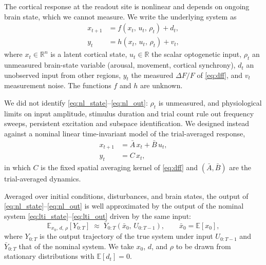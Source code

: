 The cortical response at the readout site is nonlinear and depends on ongoing brain state, which we cannot measure.
We write the underlying system as
%
\begin{align}
    x_{t+1} &= f(x_{t},\,u_{t},\,\rho_{t}) + d_{t}, \label{eq:nl_state}\\
    y_{t}   &= h(x_{t},\,u_{t},\,\rho_{t}) + v_{t}, \label{eq:nl_out}
\end{align}
%
where $x_t \in \mathbb{R}^{n}$ is a latent cortical state, $u_t \in \mathbb{R}$ the scalar optogenetic input, $\rho_t$ an unmeasured brain-state variable (arousal, movement, cortical synchrony), $d_t$ an unobserved input from other regions, $y_t$ the measured $\Delta F/F$ of \eqref{eq:dff}, and $v_t$ measurement noise.
The functions $f$ and $h$ are unknown.

We did not identify \eqref{eq:nl_state}--\eqref{eq:nl_out}: $\rho_t$ is unmeasured, and physiological limits on input amplitude, stimulus duration and trial count rule out frequency sweeps, persistent excitation and subspace identification.
We designed instead against a nominal linear time-invariant model of the trial-averaged response,
%
\begin{align}
    x_{t+1} &= \bar{A}\,x_{t} + \bar{B}\,u_{t}, \label{eq:lti_state}\\
    y_{t}   &= C\,x_{t},                        \label{eq:lti_out}
\end{align}
%
in which $C$ is the fixed spatial averaging kernel of \eqref{eq:dff} and $(\bar A, \bar B)$ are the trial-averaged dynamics.

\begin{assumption}
\label{assm:trial_avg}
Averaged over initial conditions, disturbances, and brain states, the output of \eqref{eq:nl_state}--\eqref{eq:nl_out} is well approximated by the output of the nominal system \eqref{eq:lti_state}--\eqref{eq:lti_out} driven by the same input:
\begin{equation}
    \mathbb{E}_{x_{0},\,d,\,\rho}\!\left[Y_{0:T}\right]
    \;\approx\; \bar{Y}_{0:T}\!\left(\bar{x}_{0},\,U_{0:T-1}\right),
    \qquad \bar{x}_{0} = \mathbb{E}[x_{0}],
    \label{eq:trial_avg}
\end{equation}
where $Y_{0:T}$ is the output trajectory of the true system under input $U_{0:T-1}$ and $\bar{Y}_{0:T}$ that of the nominal system.
We take $x_0$, $d$, and $\rho$ to be drawn from stationary distributions with $\mathbb{E}[d_t] = 0$.
\end{assumption}


